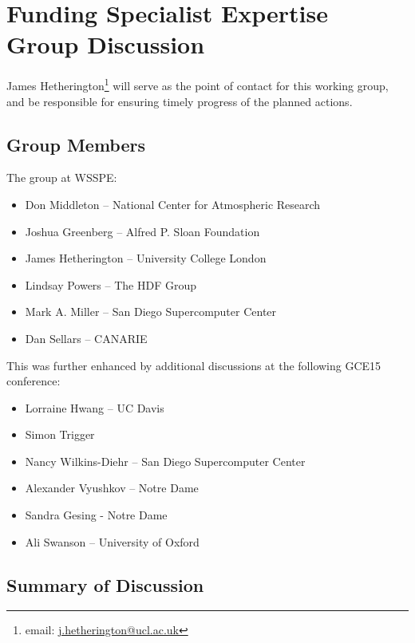 \section{Funding Specialist Expertise Group Discussion}
\label{sec:appendix_funding_spec_expert}

James Hetherington\footnote{email: \href{mailto:j.hetherington@ucl.ac.uk}{j.hetherington@ucl.ac.uk}}
will serve as the point of contact for this working group, and be responsible for ensuring timely progress of the planned actions.

\subsection{Group Members}

The group at WSSPE:

\begin{itemize}
\item Don Middleton -- National Center for Atmospheric Research
\item Joshua Greenberg -- Alfred P. Sloan Foundation
\item James Hetherington -- University College London
\item Lindsay Powers -- The HDF Group
\item Mark A. Miller -- San Diego Supercomputer Center
\item Dan Sellars -- CANARIE
\end{itemize}

This was further enhanced by additional discussions at the following
GCE15 conference:
  
\begin{itemize}
\item Lorraine Hwang -- UC Davis
\item Simon Trigger
\item Nancy Wilkins-Diehr -- San Diego Supercomputer Center
\item Alexander Vyushkov -- Notre Dame
\item Sandra Gesing - Notre Dame
\item Ali Swanson -- University of Oxford

\end{itemize}

\subsection{Summary of Discussion}

